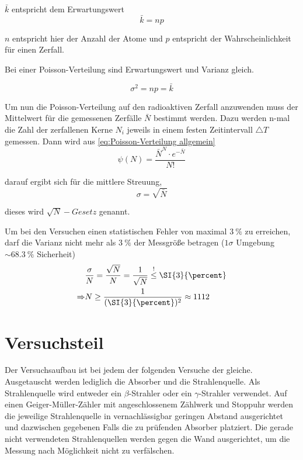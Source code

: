 $\bar{k}$ entspricht dem Erwartungswert 
\begin{equation}
	\bar{k}=np
\end{equation}


$n$ entspricht hier der Anzahl der Atome und $p$ entspricht der
Wahrscheinlichkeit für einen Zerfall.

Bei einer Poisson-Verteilung sind Erwartungswert und Varianz gleich.

\begin{equation}
	\sigma^{2}=np=\bar{k}
\end{equation}


Um nun die Poisson-Verteilung auf den radioaktiven Zerfall anzuwenden
muss der Mittelwert für die gemessenen Zerfälle $\bar{N}$ bestimmt
werden. Dazu werden n-mal die Zahl der zerfallenen Kerne $N_{i}$
jeweils in einem festen Zeitintervall $\triangle T$ gemessen. Dann
wird aus \ref{eq:Poisson-Verteilung allgemein} 
\begin{equation}
	\psi(N)=\frac{\bar{N}^{N}\cdot e^{-\bar{N}}}{N!} \label{eq:pois_id}
\end{equation}


darauf ergibt sich für die mittlere Streuung,
\begin{equation}
\sigma=\sqrt{\bar{N}} \label{eq:std_abw}
\end{equation}


dieses wird $\sqrt{N}-Gesetz$ genannt.

Um  bei den Versuchen einen statistischen Fehler von maximal $ \SI{3}{\percent} $ zu erreichen, darf die Varianz nicht mehr als $ \SI{3}{\percent} $ der Messgröße betragen ($ 1\sigma $ Umgebung $ \sim \SI{68.3}{\percent} $ Sicherheit)
\begin{align}
	&\frac{\sigma}{N} = \frac{\sqrt{N}}{N} = \frac{1}{\sqrt{N}} \stackrel{!}{\leq} \SI{3}{\percent} \notag \\
	\Rightarrow & N \geq \frac{1}{(\SI{3}{\percent})^2} \approx 1112 \label{eq_n_pulszahl}
\end{align}


\newpage
\section{Versuchsteil}
Der Versuchsaufbau ist bei jedem der folgenden Versuche der gleiche. Ausgetauscht werden lediglich die Absorber und die Strahlenquelle. Als Strahlenquelle wird entweder ein  $ \beta $-Strahler oder ein  $ \gamma $-Strahler verwendet. Auf einen Geiger-Müller-Zähler mit angeschlossenem Zählwerk und Stoppuhr werden die jeweilige Strahlenquelle in vernachlässigbar geringen Abstand ausgerichtet und dazwischen gegebenen Falls die zu prüfenden Absorber platziert. Die gerade nicht verwendeten Strahlenquellen werden gegen die Wand ausgerichtet, um die Messung nach Möglichkeit nicht zu verfälschen.

